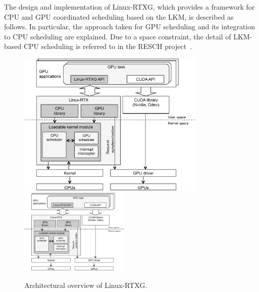 \label{sec:design_imple}
The design and implementation of Linux-RTXG, which provides a framework for CPU and GPU coordinated scheduling based on the LKM, is described as follows.
In particular, the approach taken for GPU scheduling and its integration to CPU scheduling are explained.
Due to a space constraint, the detail of LKM-based CPU scheduling is referred to in the RESCH project~\cite{kato2009loadable, asberg2012exsched}.


\begin{figure}[t]
\begin{center}
\ifthesis
\includegraphics[width=0.8\textwidth]{img/overview.pdf}
\else
\includegraphics[width=0.47\textwidth]{img/overview.pdf}

\fi
\caption{Architectural overview of Linux-RTXG.}
\vspace{-4mm}
\label{fig:overview}
\end{center}
\end{figure}

